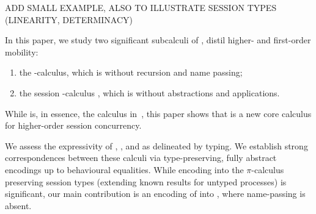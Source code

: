 ADD SMALL EXAMPLE, ALSO TO ILLUSTRATE SESSION TYPES (LINEARITY, DETERMINACY)


In this paper, we study two significant subcalculi of \HOp, 
distil higher- and first-order mobility:
\begin{enumerate}[-]
\item the \HO-calculus, which is \HOp without recursion and name passing;
\item the session \sessp-calculus , which is \HOp without abstractions and applications.  
\end{enumerate}
While \sessp is, 
in essence, the calculus in~\cite{honda.vasconcelos.kubo:language-primitives}, 
this paper shows that \HO  is a new core calculus 
for higher-order session concurrency.

We assess the expressivity 
 of \HOp, \HO, and \sessp as delineated by typing. 
We establish strong correspondences between 
these calculi  via type-preserving, fully abstract encodings up to 
behavioural equalities. While encoding \HOp 
into the $\pi$-calculus preserving session types 
(extending  known  results for untyped processes) is 
significant, 
our main contribution is 
an encoding of \HOp into \HO, where name-passing is absent.  

